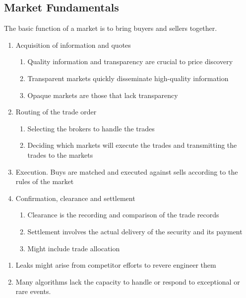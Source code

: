 \subsection{Market Fundamentals}

The basic function of a market is to bring buyers and sellers together.

\begin{process}
\begin{enumerate}[label=\roman*.]
\setlength{\itemsep}{0pt}
\item Acquisition of information and quotes
\begin{enumerate}[label=\arabic*.]
\setlength{\itemsep}{0pt}
\item Quality information and transparency are crucial to price discovery
\item Transparent markets quickly disseminate high-quality information
\item Opaque markets are those that lack transparency
\end{enumerate}
\item Routing of the trade order
\begin{enumerate}[label=\arabic*.]
\setlength{\itemsep}{0pt}
\item Selecting the brokers to handle the trades
\item Deciding which markets will execute the trades and transmitting the trades to the markets
\end{enumerate}
\item Execution. Buys are matched and executed against sells according to the rules of the market
\item Confirmation, clearance and settlement
\begin{enumerate}[label=\arabic*.]
\setlength{\itemsep}{0pt}
\item Clearance is the recording and comparison of the trade records
\item Settlement involves the actual delivery of the security and its payment
\item Might include trade allocation
\end{enumerate}
\end{enumerate}
\end{process}

\begin{remark}
\begin{enumerate}[label=\roman*.]
\setlength{\itemsep}{0pt}
\item Leaks might arise from competitor efforts to revere engineer them
\item Many algorithms lack the capacity to handle or respond to exceptional or rare events.
\end{enumerate}
\end{remark}

